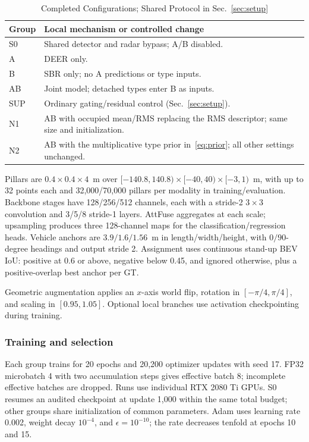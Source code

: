 \begin{table}[t]
\caption{Completed Configurations; Shared Protocol in Sec.~\ref{sec:setup}}
\label{tab:variants}
\centering
\begin{tabular}{|l|p{}|}
\hline
Group & Local mechanism or controlled change \\
\hline
S0 & Shared detector and radar bypass; A/B disabled. \\
\hline
A & DEER only. \\
\hline
B & SBR only; no A predictions or type inputs. \\
\hline
AB & Joint model; detached types enter B as inputs. \\
\hline
SUP & Ordinary gating/residual control (Sec.~\ref{sec:setup}). \\
\hline
N1 & AB with occupied mean/RMS replacing the RMS descriptor; same size and initialization. \\
\hline
N2 & AB with the multiplicative type prior in~\eqref{eq:prior}; all other settings unchanged. \\
\hline
\end{tabular}
\end{table}

Pillars are $0.4\times0.4\times4$~m over $[-140.8,140.8)\times[-40,40)\times[-3,1)$~m, with up to 32 points each and 32,000/70,000 pillars per modality in training/evaluation. Backbone stages have 128/256/512 channels, each with a stride-2 $3\times3$ convolution and 3/5/8 stride-1 layers. AttFuse aggregates at each scale; upsampling produces three 128-channel maps for the classification/regression heads. Vehicle anchors are $3.9/1.6/1.56$~m in length/width/height, with $0/90$-degree headings and output stride 2. Assignment uses continuous stand-up BEV IoU: positive at 0.6 or above, negative below 0.45, and ignored otherwise, plus a positive-overlap best anchor per GT.

Geometric augmentation applies an $x$-axis world flip, rotation in $[-\pi/4,\pi/4]$, and scaling in $[0.95,1.05]$. Optional local branches use activation checkpointing during training.

\subsubsection{Training and selection}
Each group trains for 20 epochs and 20,200 optimizer updates with seed 17. FP32 microbatch 4 with two accumulation steps gives effective batch 8; incomplete effective batches are dropped. Runs use individual RTX 2080 Ti GPUs. S0 resumes an audited checkpoint at update 1,000 within the same total budget; other groups share initialization of common parameters. Adam uses learning rate 0.002, weight decay $10^{-4}$, and $\epsilon=10^{-10}$; the rate decreases tenfold at epochs 10 and 15.

